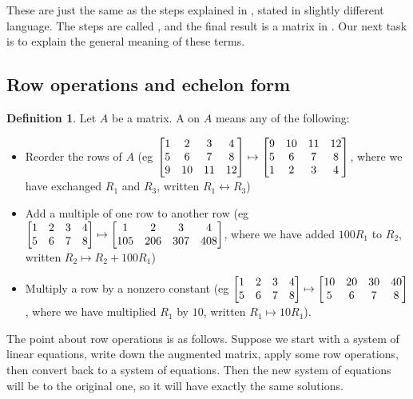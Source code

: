 \documentclass[a4paper]{book}
\theoremstyle{definition}
\newtheorem{definition}[theorem]{Definition}
\begin{document}
These are just the same as the steps explained in
, stated in slightly different language.  The
steps are called , and the final result is a
matrix in .  Our next task is to explain
the general meaning of these terms.

\subsection{Row operations and echelon form}
\label{subsec-rref}

\begin{definition}
 Let $A$ be a matrix.  A  on $A$ means any of the
 following:
 \begin{itemize}
  \item Reorder the rows of $A$
   (eg {\small $\begin{bmatrix} 1&2&3&4\\ 5&6&7&8 \\ 9&10&11&12\end{bmatrix} \mapsto
                \begin{bmatrix} 9&10&11&12\\ 5&6&7&8 \\ 1&2&3&4\end{bmatrix}$},
    where we have exchanged $R_1$ and $R_3$, written
    $R_1\leftrightarrow R_3$)
  \item Add a multiple of one row to another row
   (eg {\small $\begin{bmatrix} 1&2&3&4 \\ 5&6&7&8\end{bmatrix} \mapsto
                \begin{bmatrix} 1&2&3&4 \\ 105&206&307&408\end{bmatrix}$},
   where we have added $100R_1$ to $R_2$, written
   $R_2\mapsto R_2+100R_1$) 
  \item Multiply a row by a nonzero constant
   (eg {\small $\begin{bmatrix} 1&2&3&4 \\ 5&6&7&8\end{bmatrix} \mapsto
                \begin{bmatrix} 10&20&30&40 \\ 5&6&7&8\end{bmatrix}$},
   where we have multiplied $R_1$ by $10$, written $R_1\mapsto 10R_1$).
 \end{itemize}
\end{definition}
The point about row operations is as follows.  Suppose we start with a
system of linear equations, write down the augmented matrix, apply
some row operations, then convert back to a system of equations.  Then
the new system of equations will be  to the original
one, so it will have exactly the same solutions.  
\end{document}
